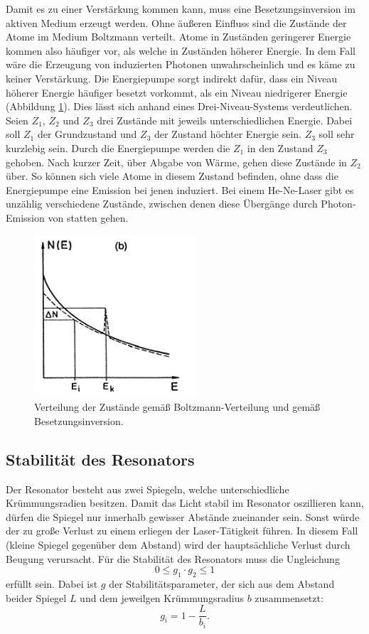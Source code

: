 Damit es zu einer Verstärkung kommen kann, muss eine Besetzungsinversion im aktiven Medium erzeugt werden. Ohne äußeren Einfluss sind die Zustände der Atome im Medium Boltzmann verteilt. Atome in Zuständen geringerer Energie kommen also häufiger vor, als welche in Zuständen höherer Energie. In dem Fall wäre die Erzeugung von induzierten Photonen unwahrscheinlich und es käme zu keiner Verstärkung.
Die Energiepumpe sorgt indirekt dafür, dass ein Niveau höherer Energie häufiger besetzt vorkommt, als ein Niveau niedrigerer Energie (Abbildung \ref{fig:inv}). Dies lässt sich anhand eines Drei-Niveau-Systems verdeutlichen. Seien $Z_1$, $Z_2$ und $Z_3$ drei Zustände mit jeweils unterschiedlichen Energie. Dabei soll $Z_1$ der Grundzustand und $Z_3$ der Zustand höchter Energie sein. $Z_3$ soll sehr kurzlebig sein. Durch die Energiepumpe werden die $Z_1$ in den Zustand $Z_3$ gehoben. Nach kurzer Zeit, über Abgabe von Wärme, gehen diese Zustände in $Z_2$ über. So können sich viele Atome in diesem Zustand befinden, ohne dass die Energiepumpe eine Emission bei jenen induziert. Bei einem He-Ne-Laser gibt es unzählig verschiedene Zustände, zwischen denen diese Übergänge durch Photon-Emission von statten gehen. 
\begin{figure}
    \centering
    \includegraphics[width=6cm]{Bilder/Inversion.PNG}
    \caption{Verteilung der Zustände gemäß Boltzmann-Verteilung und gemäß Besetzungsinversion.\cite{Laserspektroskopie_1}}
    \label{fig:inv}
\end{figure}

\subsection{Stabilität des Resonators}
Der Resonator besteht aus zwei Spiegeln, welche unterschiedliche Krümmungsradien besitzen. Damit das Licht stabil im Resonator oszillieren kann, dürfen die Spiegel nur innerhalb gewisser Abstände zueinander sein. Sonst würde der zu große Verlust zu einem erliegen der Laser-Tätigkeit führen. In diesem Fall (kleine Spiegel gegenüber dem Abstand) wird der hauptsächliche Verlust durch Beugung verursacht.
Für die Stabilität des Resonators muss die Ungleichung
\begin{equation}
    \label{eqn:g}
   0 \leq g_1 \cdot g_2 \leq 1
\end{equation}
erfüllt sein. Dabei ist $g$ der Stabilitätsparameter, der sich aus dem Abstand beider Spiegel $L$ und dem jeweilgen Krümmungsradius $b$ zusammensetzt:
\begin{equation}
    g_i = 1-\frac{L}{b_i}.
\end{equation}


